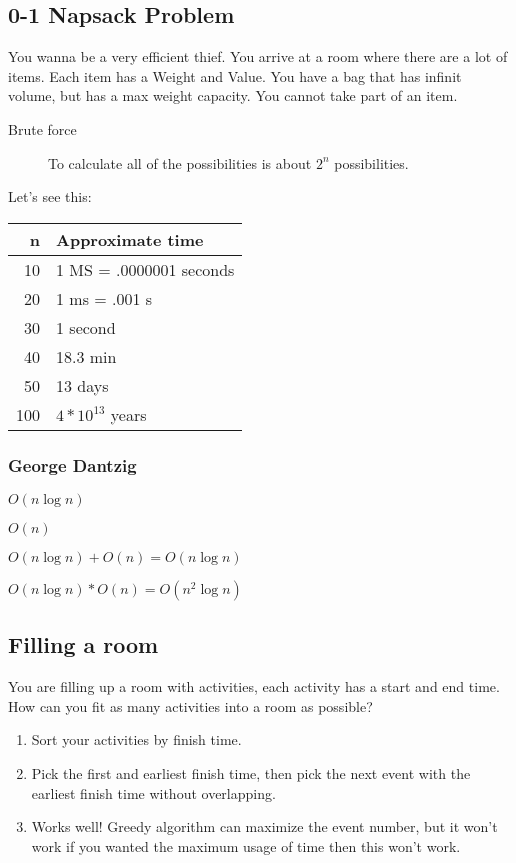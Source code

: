 \documentclass{article}
\begin{document}
\subsection{0-1 Napsack Problem}
\label{sec:org1c9f5e9}
You wanna be a very efficient thief. You arrive at a room where there are a lot of items. Each item has a Weight and Value. You have a bag that has infinit volume, but has a max weight capacity. You cannot take part of an item.
\begin{description}
\item[{Brute force}] To calculate all of the possibilities is about \(2^n\) possibilities.
\end{description}
Let's see this:
\begin{center}
\begin{tabular}{rl}
n & Approximate time\\
\hline
10 & 1 MS = .0000001 seconds\\
20 & 1 ms = .001 s\\
30 & 1 second\\
40 & 18.3 min\\
50 & 13 days\\
100 & \(4*10^{13}\) years\\
\end{tabular}
\end{center}
\subsubsection{George Dantzig}
\label{sec:orgf57b97f}
\begin{description}
\item[{Sort by decreasing \(\frac{V_i}{W_i}\)}] \(O(n\log{n})\)
\item[{Grab items that fit into the bag}] \(O(n)\)
\item \(O(n\log{n})+O(n)=O(n\log{n})\)
\item \(O(n\log{n})*O(n)=O(n^2\log{n})\)
\end{description}
\subsection{Filling a room}
\label{sec:org0cf6e65}
You are filling up a room with activities, each activity has a start and end time. How can you fit as many activities into a room as possible?
\begin{enumerate}
\item Sort your activities by finish time.
\item Pick the first and earliest finish time, then pick the next event with the earliest finish time without overlapping.
\item Works well! Greedy algorithm can maximize the event number, but it won't work if you wanted the maximum usage of time then this won't work.
\end{enumerate}
\end{document}
